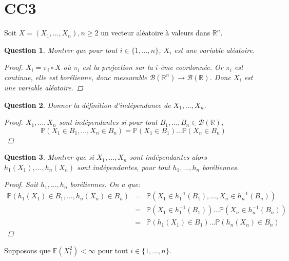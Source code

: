 \documentclass{article}
\theoremstyle{plain}
\newtheorem{question}{Question}
\begin{document}
\section{CC3}

Soit $X = (X_1, \dots, X_n), n \geq 2$ un vecteur aléatoire à valeurs dans $\mathbb{R}^n$.

\begin{question}
	Montrer que pour tout $i \in \{1, \dots, n\}$, $X_i$ est une variable aléatoire.
	\begin{proof}
		$X_i = \pi_i \circ X$ où $\pi_i$ est la projection sur la $i$-ème coordonnée. Or $\pi_i$ est continue,
		elle est borélienne, donc messurable $\mathscr{B} (\mathbb{R}^n) \to \mathscr{B} (\mathbb{R})$.
		Donc $X_i$ est une variable aléatoire.
	\end{proof}
\end{question}

\begin{question}
	Donner la définition d'indépendance de $X_1, \dots, X_n$.
	\begin{proof}
		$X_1, \dots, X_n$ sont indépendantes si pour tout $B_1, \dots, B_n \in \mathscr{B} (\mathbb{R})$,
		\begin{equation*}
			\mathbb{P} (X_1 \in B_1, \dots, X_n \in B_n) = \mathbb{P} (X_1 \in B_1) \dots \mathbb{P} (X_n \in B_n)
		\end{equation*}
	\end{proof}
\end{question}

\begin{question}
	Montrer que si $X_1, \dots, X_n$ sont indépendantes alors $h_1 (X_1), \dots, h_n (X_n)$ sont indépendantes, pour tout $h_1, \dots, h_n$ boréliennes.

	\begin{proof}
		Soit $h_1, \dots, h_n$ boréliennes. On a que:
		\begin{eqnarray*}
			\mathbb{P} (h_1 (X_1) \in B_1, \dots, h_n (X_n) \in B_n) &=& \mathbb{P} (X_1 \in h_1^{-1} (B_1), \dots, X_n \in h_n^{-1} (B_n)) \\
			&=& \mathbb{P} (X_1 \in h_1^{-1} (B_1)) \dots \mathbb{P} (X_n \in h_n^{-1} (B_n)) \\
			&=& \mathbb{P} (h_1 (X_1) \in B_1) \dots \mathbb{P} (h_n (X_n) \in B_n)
		\end{eqnarray*}
	\end{proof}
\end{question}

Supposons que $\mathbb{E} (X_i^2) < \infty$ pour tout $i \in \{1, \dots, n\}$.
\end{document}

